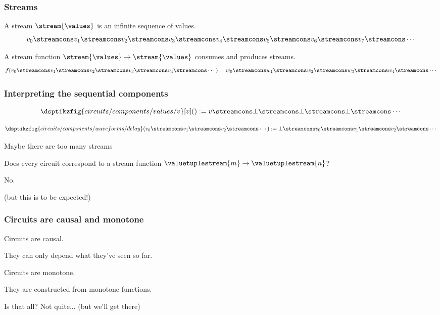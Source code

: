 \begin{frame}
    \frametitle{Streams}

    A \alert{stream} \(\stream{\values}\) is an infinite sequence of values.
    \[
        v_0
        \streamcons
        v_1
        \streamcons
        v_2
        \streamcons
        v_3
        \streamcons
        v_4
        \streamcons
        v_5
        \streamcons
        v_6
        \streamcons
        v_7
        \streamcons
        \cdots
    \]

    \wait
    A \alert{stream function} \(\stream{\values} \to \stream{\values}\) consumes and
    produces streams.
    \[
        f(
            v_0
            \streamcons
            v_1
            \streamcons
            v_2
            \streamcons
            v_3
            \streamcons
            v_4
            \streamcons
            \cdots
        ) =
        w_0
        \streamcons
        w_1
        \streamcons
        w_2
        \streamcons
        w_3
        \streamcons
        w_4
        \streamcons
        \cdots
    \]
\end{frame}
\begin{frame}
    \frametitle{Interpreting the sequential components}
    \wait
    \[
        \dsptikzfig{circuits/components/values/v}[v]()
        :=
        v \streamcons \bot \streamcons \bot \streamcons \bot \streamcons \cdots
    \]

    \wait
    \vspace{1em}

    \[
        \dsptikzfig{circuits/components/waveforms/delay}(
            v_0 \streamcons v_1 \streamcons v_2 \streamcons \cdots
        )
        :=
        \bot \streamcons v_0 \streamcons v_1 \streamcons v_2 \streamcons \cdots
    \]
\end{frame}
\begin{frame}{Maybe there are too many streams}

    \centering
    \LARGE
    Does every circuit correspond to a stream function \(
        \valuetuplestream{m} \to \valuetuplestream{n}
    \)?

    \Huge
    \wait
    No.

    \scriptsize
    \wait
    (but this is to be expected!)
\end{frame}
\begin{frame}
    \frametitle{Circuits are causal and monotone}

    \wait
    \Large
    Circuits are \alert{causal}.

    \wait

    \normalsize
    They can only depend \alert{what they've seen so far}.

    \wait

    \Large
    Circuits are \alert{monotone}.

    \wait

    \normalsize
    They are constructed from \alert{monotone functions}.

    \wait

    Is that all?
    \wait
    \alert{Not quite...}
    \wait
    (but we'll get there)


\end{frame}
